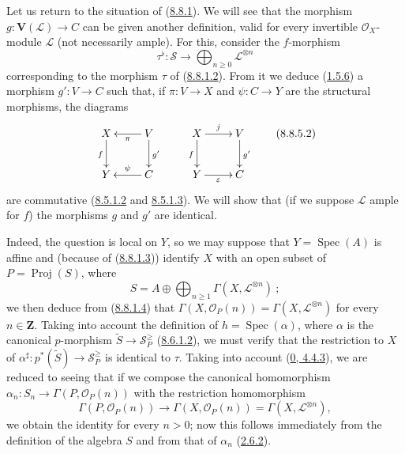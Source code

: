 \begin{env}[8.8.5]
\label{II.8.8.5}
Let us return to the situation of (\hyperref[II.8.8.1]{8.8.1}). We will see
that the morphism $g:\mathbf{V}(\mathcal{L})\to C$ can be given another
definition, valid for every invertible $\mathcal{O}_X$-module $\mathcal{L}$
(not necessarily ample). For this, consider the $f$-morphism
\begin{equation}
\label{II.8.8.5.1}
  \tau^\flat:\mathcal{S}\longrightarrow
  \bigoplus_{n\geqslant 0}\mathcal{L}^{\otimes n}
\tag{8.8.5.1}
\end{equation}
corresponding to the morphism $\tau$ of
(\hyperref[II.8.8.1.2]{8.8.1.2}). From it we deduce
(\hyperref[II.1.5.6]{1.5.6}) a morphism $g':V\to C$ such that, if
$\pi:V\to X$ and $\psi:C\to Y$ are the structural morphisms, the diagrams
\begin{equation}
\label{II.8.8.5.2}
  \xymatrix{
    X\ar[d]_{f} & V\ar[l]^{\pi}\ar[d]^{g'}\\
    Y & C\ar[l]_{\psi}
  }
  \qquad
  \xymatrix{
    X\ar[r]^{j}\ar[d]_{f} & V\ar[d]^{g'}\\
    Y\ar[r]_{\varepsilon} & C
  }
\tag{8.8.5.2}
\end{equation}
are commutative
(\hyperref[II.8.5.1.2]{8.5.1.2} and
\hyperref[II.8.5.1.3]{8.5.1.3}). We will show that (if we suppose
$\mathcal{L}$ ample for $f$) the morphisms $g$ and $g'$ are identical.

Indeed, the question is local on $Y$, so we may suppose that
$Y=\operatorname{Spec}(A)$ is affine and (because of
(\hyperref[II.8.8.1.3]{8.8.1.3})) identify $X$ with an open subset of
$P=\operatorname{Proj}(S)$, where
\[
  S=A\oplus\bigoplus_{n\geqslant 1}
  \Gamma(X,\mathcal{L}^{\otimes n})~;
\]
we then deduce from (\hyperref[II.8.8.1.4]{8.8.1.4}) that
$\Gamma(X,\mathcal{O}_P(n))=\Gamma(X,\mathcal{L}^{\otimes n})$ for every
$n\in\mathbf{Z}$. Taking into account the definition of
$h=\operatorname{Spec}(\alpha)$, where $\alpha$ is the canonical $p$-morphism
$\widetilde{S}\to\mathcal{S}_P^{\geqslant}$
(\hyperref[II.8.6.1.2]{8.6.1.2}), we must verify that the restriction to
$X$ of
$\alpha^\sharp:p^*(\widetilde{S})\to\mathcal{S}_P^{\geqslant}$ is
identical to $\tau$. Taking into account
(\hyperref[0.4.4.3]{0, 4.4.3}), we are reduced to seeing that if we compose
the canonical homomorphism
$\alpha_n:S_n\to\Gamma(P,\mathcal{O}_P(n))$ with the restriction
homomorphism
\[
  \Gamma(P,\mathcal{O}_P(n))\longrightarrow
  \Gamma(X,\mathcal{O}_P(n))=
  \Gamma(X,\mathcal{L}^{\otimes n}),
\]
we obtain the identity for every $n>0$; now this follows immediately from the
definition of the algebra $S$ and from that of $\alpha_n$
(\hyperref[II.2.6.2]{2.6.2}).
\end{env}

